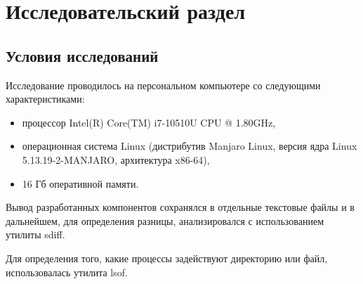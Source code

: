 \section{Исследовательский раздел}
\subsection{Условия исследований}
Исследование проводилось на персональном компьютере со следующими характеристиками:

\begin{itemize}
\item процессор Intel(R) Core(TM) i7-10510U CPU @ 1.80GHz,
\item операционная система Linux (дистрибутив Manjaro Linux, версия ядра Linux 5.13.19-2-MANJARO, архитектура x86-64),
\item 16 Гб оперативной памяти.
\end{itemize}

Вывод разработанных компонентов сохранялся в отдельные текстовые файлы и в дальнейшем, для определения разницы, анализировался с использованием утилиты sdiff.

Для определения того, какие процессы задействуют директорию или файл, использовалась утилита lsof.

